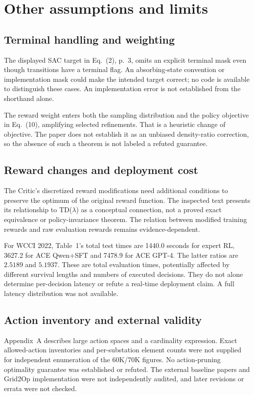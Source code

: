 \documentclass[10pt]{article}
\begin{document}
\section*{Other assumptions and limits}
\subsection*{Terminal handling and weighting}
The displayed SAC target in Eq. (2), p. 3, omits an explicit terminal mask even though transitions have a terminal flag. An absorbing-state convention or implementation mask could make the intended target correct; no code is available to distinguish these cases. An implementation error is not established from the shorthand alone.\par
The reward weight enters both the sampling distribution and the policy objective in Eq. (10), amplifying selected refinements. That is a heuristic change of objective. The paper does not establish it as an unbiased density-ratio correction, so the absence of such a theorem is not labeled a refuted guarantee.\par
\subsection*{Reward changes and deployment cost}
The Critic’s discretized reward modifications need additional conditions to preserve the optimum of the original reward function. The inspected text presents its relationship to TD(\(\lambda\)) as a conceptual connection, not a proved exact equivalence or policy-invariance theorem. The relation between modified training rewards and raw evaluation rewards remains evidence-dependent.\par
For WCCI 2022, Table 1’s total test times are 1440.0 seconds for expert RL, 3627.2 for ACE Qwen+SFT and 7478.9 for ACE GPT-4. The latter ratios are \(2.5189\) and \(5.1937\). These are total evaluation times, potentially affected by different survival lengths and numbers of executed decisions. They do not alone determine per-decision latency or refute a real-time deployment claim. A full latency distribution was not available.\par
\subsection*{Action inventory and external validity}
Appendix A describes large action spaces and a cardinality expression. Exact allowed-action inventories and per-substation element counts were not supplied for independent enumeration of the 60K/70K figures. No action-pruning optimality guarantee was established or refuted. The external baseline papers and Grid2Op implementation were not independently audited, and later revisions or errata were not checked.\par
\end{document}
